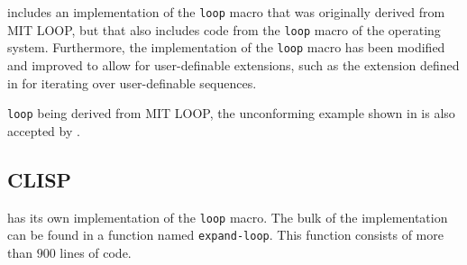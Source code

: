 \sbcl{} includes an implementation of the \texttt{loop} macro that was
originally derived from MIT LOOP, but that also includes code from the
\texttt{loop} macro of the \genera{} operating system.  Furthermore,
the \sbcl{} implementation of the \texttt{loop} macro has been
modified and improved to allow for user-definable extensions, such as
the extension defined in \cite{Rhodes:2007:USC:1622123.1622138} for
iterating over user-definable sequences.

\sbcl{} \texttt{loop} being derived from MIT LOOP, the unconforming
example shown in  is also accepted by \sbcl{}.

\subsection{CLISP}

\clisp{} has its own implementation of the \texttt{loop} macro.  The
bulk of the implementation can be found in a function named
\texttt{expand-loop}.  This function consists of more than $900$ lines
of code.
